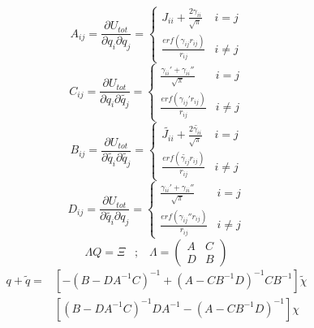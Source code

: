 \documentclass[12pt,english]{article}
\begin{document}
	\newline
	\begin{equation}
		A_{ij}=\frac{\partial U_{tot}}{\partial q_i \partial q_j} = 
		\begin{cases}
			J_{ii}+\frac{2\gamma_{ii}}{\sqrt{\pi}} & i =j\\
			\frac{erf(\gamma_{ij}r_{ij})}{r_{ij}} & i \neq j
		\end{cases}
	\end{equation}
	\begin{equation}
		C_{ij}=\frac{\partial U_{tot}}{\partial q_i \partial \tilde{q_j}} =
		\begin{cases}
			\frac{\gamma_{ii}'+\gamma_{ii}''}{\sqrt{\pi}} & i=j \\
			\frac{erf(\gamma_{ij}'r_{ij})}{r_{ij}} & i\neq j
		\end{cases}
	\end{equation}
	\begin{equation}
		B_{ij}=\frac{\partial U_{tot}}{\partial \tilde{q_i} \partial \tilde{q_j}} =
		\begin{cases}
			\tilde{J_{ii}}+\frac{2\tilde{\gamma_{ii}}}{\sqrt{\pi}} & i=j\\
			\frac{erf(\tilde{\gamma_{ij}}r_{ij})}{r_{ij}} & i \neq j
		\end{cases}
	\end{equation}
	\begin{equation}
		D_{ij}=\frac{\partial U_{tot}}{\partial \tilde{q_i} \partial q_j} = 
		\begin{cases}
			\frac{\gamma_{ii}'+\gamma_{ii}''}{\sqrt{\pi}} & i=j \\
			\frac{erf(\gamma_{ij}''r_{ij})}{r_{ij}} & i\neq j
		\end{cases}
	\end{equation}
	\begin{equation}
		\Lambda Q = \Xi \hspace{10pt} ; \hspace{10pt}  \Lambda =
	\begin{pmatrix}
		A & C \\
		D & B
	\end{pmatrix}
	\end{equation}	
	\begin{equation}
		\begin{split}
			q+\tilde{q} = &[-(B-DA^{-1}C)^{-1}+(A-CB^{-1}D)^{-1}CB^{-1}]\tilde{\chi} \\
						  &[(B-DA^{-1}C)^{-1}DA^{-1} - (A-CB^{-1}D)^{-1}]\chi 
		\end{split}
	\end{equation}
\end{document}
